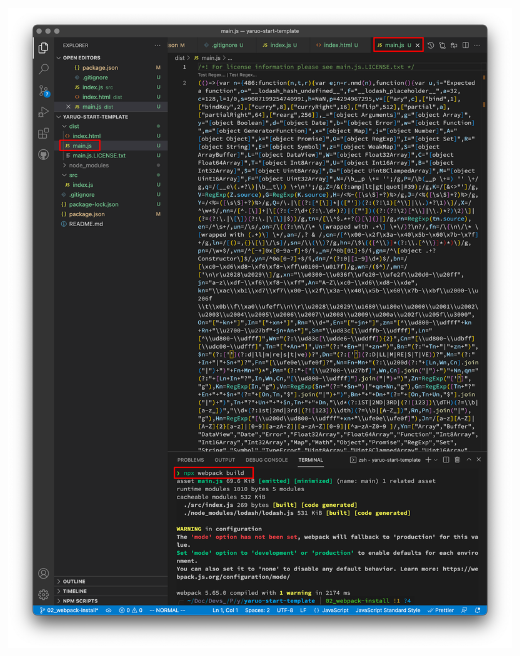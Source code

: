 \begin{reviewimage}%
\includegraphics[width=0.8\maxwidth]{./images/02-create-react-app/webpack_test03.png}%
\label{image:02-create-react-app:webpack_test03}
\end{reviewimage}

\clearpage


